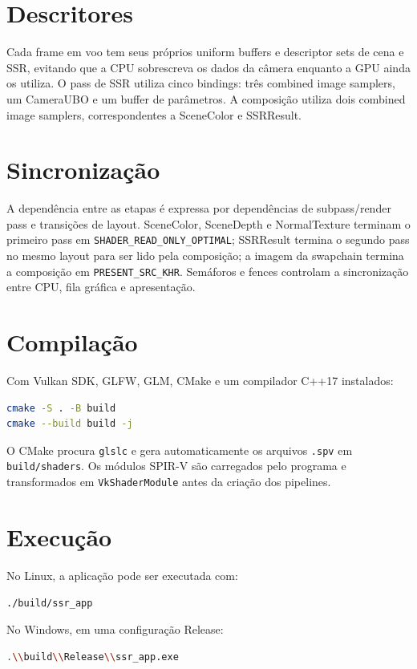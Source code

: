\documentclass[12pt,a4paper]{article}
\begin{document}
\section{Descritores}
Cada frame em voo tem seus próprios uniform buffers e descriptor sets de cena e SSR, evitando que a CPU sobrescreva os dados da câmera enquanto a GPU ainda os utiliza. O pass de SSR utiliza cinco bindings: três combined image samplers, um CameraUBO e um buffer de parâmetros. A composição utiliza dois combined image samplers, correspondentes a SceneColor e SSRResult.

\section{Sincronização}
A dependência entre as etapas é expressa por dependências de subpass/render pass e transições de layout. SceneColor, SceneDepth e NormalTexture terminam o primeiro pass em \texttt{SHADER\_READ\_ONLY\_OPTIMAL}; SSRResult termina o segundo pass no mesmo layout para ser lido pela composição; a imagem da swapchain termina a composição em \texttt{PRESENT\_SRC\_KHR}. Semáforos e fences controlam a sincronização entre CPU, fila gráfica e apresentação.

\section{Compilação}
Com Vulkan SDK, GLFW, GLM, CMake e um compilador C++17 instalados:
\begin{lstlisting}[language=bash]
cmake -S . -B build
cmake --build build -j
\end{lstlisting}
O CMake procura \texttt{glslc} e gera automaticamente os arquivos \texttt{.spv} em \texttt{build/shaders}. Os módulos SPIR-V são carregados pelo programa e transformados em \texttt{VkShaderModule} antes da criação dos pipelines.

\section{Execução}
No Linux, a aplicação pode ser executada com:
\begin{lstlisting}[language=bash]
./build/ssr_app
\end{lstlisting}
No Windows, em uma configuração Release:
\begin{lstlisting}[language=bash]
.\\build\\Release\\ssr_app.exe
\end{lstlisting}
\end{document}
